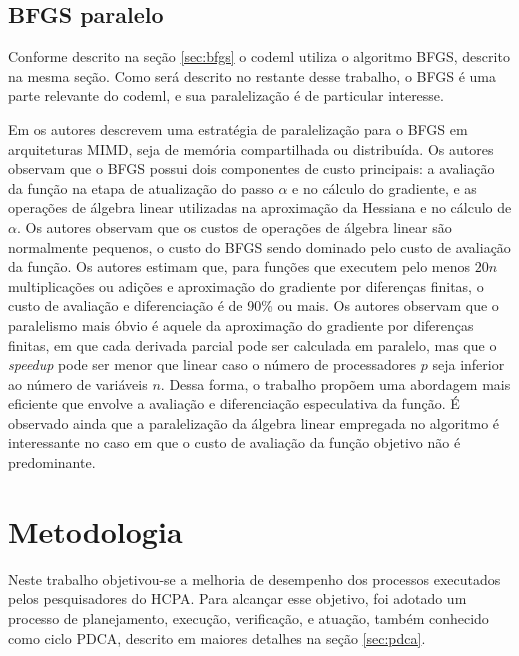 \documentclass[cic,tc]{iiufrgs}
\begin{document}
\section{BFGS paralelo}
\label{sec:parbfgs}

Conforme descrito na seção \ref{sec:bfgs} o codeml utiliza o algoritmo BFGS,
descrito na mesma seção. Como será descrito no restante desse trabalho, o BFGS
é uma parte relevante do codeml, e sua paralelização é de particular interesse.

Em \cite{byrd1988parallel} os autores descrevem uma estratégia de paralelização
para o BFGS em arquiteturas MIMD, seja de memória compartilhada ou distribuída.
Os autores observam que o BFGS possui dois componentes de custo principais: a
avaliação da função na etapa de atualização do passo $\alpha$ e no cálculo do
gradiente, e as operações de álgebra linear utilizadas na aproximação da
Hessiana e no cálculo de $\alpha$. Os autores observam que os custos de
operações de álgebra linear são normalmente pequenos, o custo do BFGS sendo
dominado pelo custo de avaliação da função. Os autores estimam que, para
funções que executem pelo menos $20n$ multiplicações ou adições e aproximação
do gradiente por diferenças finitas, o custo de avaliação e diferenciação é de
90\% ou mais. Os autores observam que o paralelismo mais óbvio é aquele da
aproximação do gradiente por diferenças finitas, em que cada derivada parcial
pode ser calculada em paralelo, mas que o \textit{speedup} pode ser menor que
linear caso o número de processadores $p$ seja inferior ao número de variáveis
$n$. Dessa forma, o trabalho propõem uma abordagem mais eficiente que envolve a
avaliação e diferenciação especulativa da função. É observado ainda que a
paralelização da álgebra linear empregada no algoritmo é interessante no caso
em que o custo de avaliação da função objetivo não é predominante.

%
%
%
%

\chapter{Metodologia} 
\label{chap:mod}

Neste trabalho objetivou-se a melhoria de desempenho dos processos executados
pelos pesquisadores do HCPA. Para alcançar esse objetivo, foi adotado um
processo de planejamento, execução, verificação, e atuação, também conhecido
como ciclo PDCA, descrito em maiores detalhes na seção \ref{sec:pdca}.
\end{document}
